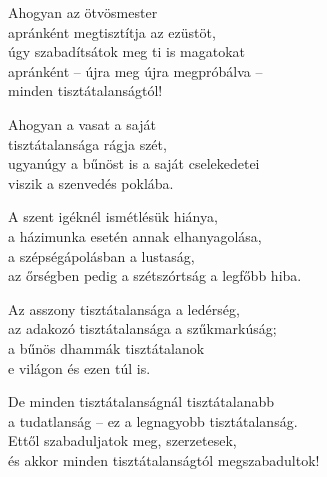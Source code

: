 \begin{dhpverse}

 Ahogyan az ötvösmester\\
apránként megtisztítja az ezüstöt,\\
úgy szabadítsátok meg ti is magatokat\\
apránként – újra meg újra megpróbálva –\\
minden tisztátalanságtól!

 Ahogyan a vasat a saját\\
tisztátalansága rágja szét,\\
ugyanúgy a bűnöst is a saját cselekedetei\\
viszik a szenvedés poklába.

 A szent igéknél ismétlésük hiánya,\\
a házimunka esetén annak elhanyagolása,\\
a szépségápolásban a lustaság,\\
az őrségben pedig a szétszórtság a legfőbb hiba.

 Az asszony tisztátalansága a ledérség,\\
az adakozó tisztátalansága a szűkmarkúság;\\
a bűnös dhammák tisztátalanok\\
e világon és ezen túl is.

 De minden tisztátalanságnál tisztátalanabb\\
a tudatlanság – ez a legnagyobb tisztátalanság.\\
Ettől szabaduljatok meg, szerzetesek,\\
és akkor minden tisztátalanságtól megszabadultok!

\end{dhpverse}
\newpage

